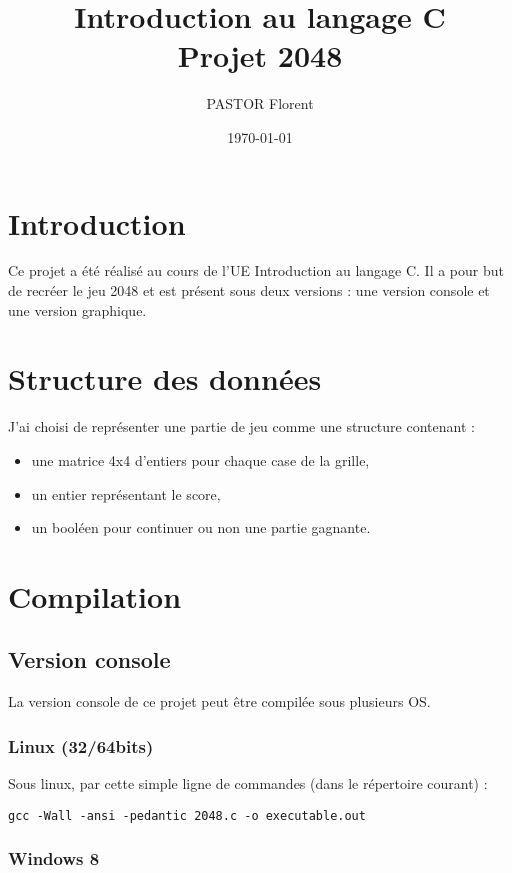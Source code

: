 ﻿\documentclass[11pt]{article}
\title{Introduction au langage C\\Projet 2048}
\author{PASTOR Florent}
\date{\today}
\begin{document}
\maketitle

\section{Introduction}
Ce projet a été réalisé au cours de l'UE Introduction au langage C. Il a pour but de recréer le jeu 2048 et est présent sous deux versions : une version console et une version graphique.

\section{Structure des données}
J'ai choisi de représenter une partie de jeu comme une structure contenant :
\begin{itemize}
	\item une matrice 4x4 d'entiers pour chaque case de la grille,
	\item un entier représentant le score,
	\item un booléen pour continuer ou non une partie gagnante.
\end{itemize}

\section{Compilation}

\subsection{Version console}

La version console de ce projet peut être compilée sous plusieurs OS.

\subsubsection{Linux (32/64bits)}
Sous linux, par cette simple ligne de commandes (dans le répertoire courant) :
\begin{verbatim}
gcc -Wall -ansi -pedantic 2048.c -o executable.out
\end{verbatim}

\subsubsection{Windows 8}
\end{document}
